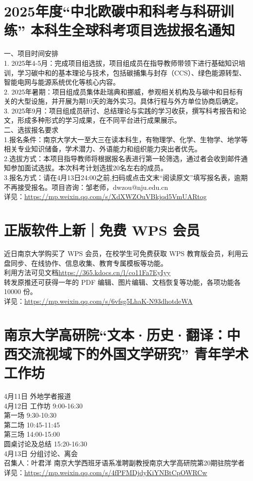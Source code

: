 \documentclass[letterpaper, 12pt]{article}
\begin{document}
\begin{multicols}{2}
\section{2025年度“中北欧碳中和科考与科研训练” 本科生全球科考项目选拔报名通知}
一、项目时间安排    
\\1. 2025年4-5月：完成项目组选拔，项目组成员在指导教师带领下进行基础知识培训，学习碳中和的基本理论与技术，包括碳捕集与封存（CCS）、绿色能源转型、智能电网与能源系统优化等核心内容。    
\\2. 2025年暑期：项目组成员集体赴瑞典和挪威，参观相关机构及与碳中和目标有关的大型设施，并开展为期10天的海外实习。具体行程与外方单位协商后确定。    
\\3. 2025年9月：项目组成员研讨、总结理论与实践的学习收获，撰写科考报告和论文，形成多种形式的学习成果，在不同平台进行成果展示。
\\二、选拔报名要求     
\\1.报名条件：南京大学大一至大三在读本科生，有物理学、化学、生物学、地学等相关专业知识储备，学术潜力、外语能力和组织能力突出者优先。     
\\2.选拔方式：本项目指导教师将根据报名表进行第一轮筛选，通过者会收到邮件通知参加面试选拔。本次科考计划选拔20名左右的成员。    
\\3.报名方式：请在4月13日24:00之前,扫码或点击文末“阅读原文”填写报名表，逾期不再接受报名。项目咨询：邹老师，dwzou@nju.edu.cn
\\详见：\url{https://mp.weixin.qq.com/s/XdXWZOuVBkjqd5VmUARtog}

\section{正版软件上新｜免费 WPS 会员}
近日南京大学购买了 WPS 会员，在校学生可免费获取 WPS 教育版会员，利用云盘同步、在线协作、信息收集、教育专属模板等功能。
\\利用方法可见文档\url{https://365.kdocs.cn/l/co11Fa7EyIyy}
\\转发原推还可获得一年的 PDF 编辑、图片编辑、文档恢复等功能，各项功能各 10000 份。
\\详见：\url{https://mp.weixin.qq.com/s/6vfsg5LhaK-N93dhotdeWA}

\section{南京大学高研院“文本·历史·翻译：中西交流视域下的外国文学研究”  青年学术工作坊}
4月11日 外地学者报道
\\4月12日 工作坊 9:00-16:30
\\第一场 9:30-10:30
\\第二场 10:45-11:45
\\第三场 14:00-15:00
\\圆桌讨论及总结 15:20-16:30
\\4月13日 分组讨论、离会
\\召集人：叶君洋 南京大学西班牙语系准聘副教授南京大学高研院第20期驻院学者
\\详见：\url{https://mp.weixin.qq.com/s/4fPFMDjdyKiYNBtCpOWRCw}



\end{multicols}
\end{document}
